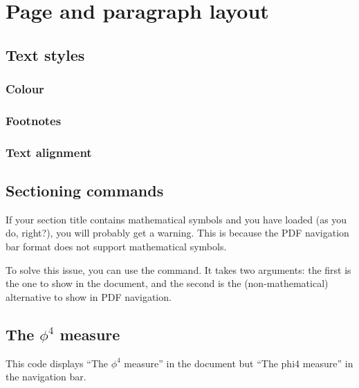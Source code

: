 \chapter{Page and paragraph layout}

\section{Text styles}

\subsection{Colour}

\subsection{Footnotes}


\subsection{Text alignment}



%
%
%
\section{Sectioning commands}

\begin{gotcha}
If your section title contains mathematical symbols
and you have  loaded (as you do, right?),
you will probably get a warning.
This is because the PDF navigation bar format does not support mathematical symbols.

To solve this issue, you can use the  command.
It takes two arguments: the first is the one to show in the document,
and the second is the (non-mathematical) alternative to show in PDF navigation.
\begin{ExampleCode}
\section{The \texorpdfstring{$\phi^4$}{phi4} measure}
\end{ExampleCode}
This code displays ``The $\phi^4$ measure'' in the document
but ``The phi4 measure'' in the navigation bar.
\end{gotcha}


